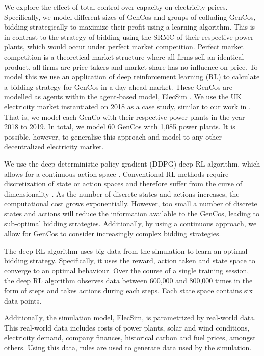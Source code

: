 \documentclass[conference]{IEEEtran}
\begin{document}
We explore the effect of total control over capacity on electricity prices. Specifically, we model different sizes of GenCos and groups of colluding GenCos, bidding strategically to maximize their profit using a learning algorithm. This is in contrast to the strategy of bidding using the SRMC of their respective power plants, which would occur under perfect market competition. Perfect market competition is a theoretical market structure where all firms sell an identical product, all firms are price-takers and market share has no influence on price. To model this we use an application of deep reinforcement learning (RL) to calculate a bidding strategy for GenCos in a day-ahead market. These GenCos are modelled as agents within the agent-based model, ElecSim \cite{Kell, Kell2020}. We use the UK electricity market instantiated on 2018 as a case study, similar to our work in \cite{Kell2019a}. That is, we model each GenCo with their respective power plants in the year 2018 to 2019. In total, we model 60 GenCos with 1,085 power plants. It is possible, however, to generalise this approach and model to any other decentralized electricity market. 

We use the deep deterministic policy gradient (DDPG) deep RL algorithm, which allows for a continuous action space \cite{Hunt2016a}. Conventional RL methods require discretization of state or action spaces and therefore suffer from the curse of dimensionality \cite{Ye2020a}. As the number of discrete states and actions increases, the computational cost grows exponentially. However, too small a number of discrete states and actions will reduce the information available to the GenCos, leading to sub-optimal bidding strategies. Additionally, by using a continuous approach, we allow for GenCos to consider increasingly complex bidding strategies.

The deep RL algorithm uses big data from the simulation to learn an optimal bidding strategy. Specifically, it uses the reward, action taken and state space to converge to an optimal behaviour. Over the course of a single training session, the deep RL algorithm observes data between 600,000 and 800,000 times in the form of steps and takes actions during each  steps. Each state space contains six data points.

Additionally, the simulation model, ElecSim, is parametrized by real-world data. This real-world data includes costs of power plants, solar and wind conditions, electricity demand, company finances, historical carbon and fuel prices, amongst others. Using this data, rules are used to generate data used by the simulation.
\end{document}
